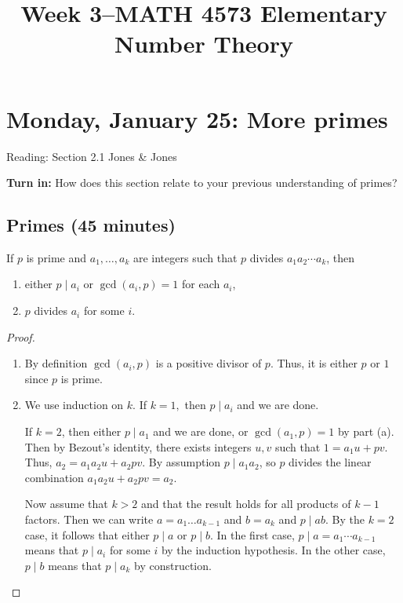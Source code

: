 \documentclass[letterpaper, 11 pt]{article}
\title{Week 3--MATH 4573 Elementary Number Theory}
\begin{document}
\maketitle
\tableofcontents

\section{Monday, January 25: More primes}
Reading: Section 2.1 Jones \& Jones

{\bf Turn in:} How does this section relate to your previous understanding of primes? 


\subsection{Primes (45 minutes)}
\begin{lem}
 If $p$ is prime and $a_1,\dots, a_k$ are integers such that $p$ divides $a_1a_2\cdots a_k$, then 
 
\begin{enumerate}
 \item either $p\mid a_i$ or $\gcd(a_i,p)=1$ for each $a_i$,
 \item $p$ divides $a_i$ for some $i$.
\end{enumerate}
\end{lem}
\begin{proof}
 
\begin{enumerate}
 \item By definition $\gcd(a_i,p)$ is a positive divisor of $p$. Thus, it is either $p$ or $1$ since $p$ is prime.
 \item We use induction on $k$. If $k=1,$ then $p\mid a_i$ and we are done.
 
 If $k=2$, then either $p\mid a_1$ and we are done, or $\gcd(a_1,p)=1$ by part (a). Then by Bezout's identity, there exists integers $u,v$ such that $1=a_1u+pv$. Thus, $a_2=a_1a_2u+a_2pv$. By assumption $p\mid a_1a_2$, so $p$ divides the linear combination $a_1a_2u+a_2pv=a_2$.
 
 Now assume that $k>2$ and that the result holds for all products of $k-1$ factors. Then we can write $a=a_1\dots a_{k-1}$ and $b=a_k$ and $p\mid ab$. By the $k=2$ case, it follows that either $p\mid a$ or $p\mid b$. In the first case, $p\mid a=a_1\cdots a_{k-1}$ means that $p\mid a_i$ for some $i$ by the induction hypothesis. In the other case, $p\mid b$ means that $p\mid a_k$ by construction. \qedhere
 \end{enumerate}
\end{proof}
\end{document}
